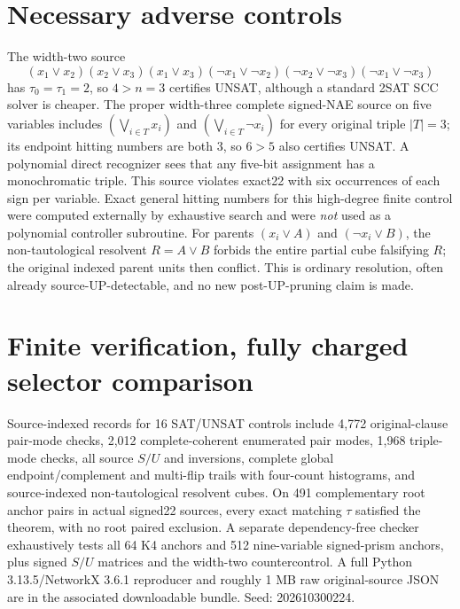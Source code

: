 \documentclass[10pt]{article}
\begin{document}
\section{Necessary adverse controls}
The width-two source
\[
(x_1\vee x_2)(x_2\vee x_3)(x_1\vee x_3)
(\neg x_1\vee\neg x_2)(\neg x_2\vee\neg x_3)(\neg x_1\vee\neg x_3)
\]
has $\tau_0=\tau_1=2$, so $4>n=3$ certifies UNSAT, although a standard 2SAT SCC solver is cheaper. The proper width-three complete signed-NAE source on five variables includes $(\bigvee_{i\in T}x_i)$ and $(\bigvee_{i\in T}\neg x_i)$ for every original triple $|T|=3$; its endpoint hitting numbers are both 3, so $6>5$ also certifies UNSAT. A polynomial direct recognizer sees that any five-bit assignment has a monochromatic triple. This source violates exact22 with six occurrences of each sign per variable. Exact general hitting numbers for this high-degree finite control were computed externally by exhaustive search and were \emph{not} used as a polynomial controller subroutine.
For parents $(x_i\vee A)$ and $(\neg x_i\vee B)$, the non-tautological resolvent $R=A\vee B$ forbids the entire partial cube falsifying $R$; the original indexed parent units then conflict. This is ordinary resolution, often already source-UP-detectable, and no new post-UP-pruning claim is made.

\section{Finite verification, fully charged selector comparison}
Source-indexed records for 16 SAT/UNSAT controls include 4,772 original-clause pair-mode checks, 2,012 complete-coherent enumerated pair modes, 1,968 triple-mode checks, all source $S/U$ and inversions, complete global endpoint/complement and multi-flip trails with four-count histograms, and source-indexed non-tautological resolvent cubes. On 491 complementary root anchor pairs in actual signed22 sources, every exact matching $\tau$ satisfied the theorem, with no root paired exclusion. A separate dependency-free checker exhaustively tests all 64 K4 anchors and 512 nine-variable signed-prism anchors, plus signed $S/U$ matrices and the width-two countercontrol. A full Python 3.13.5/NetworkX 3.6.1 reproducer and roughly 1 MB raw original-source JSON are in the associated downloadable bundle. Seed: 202610300224.
\end{document}
